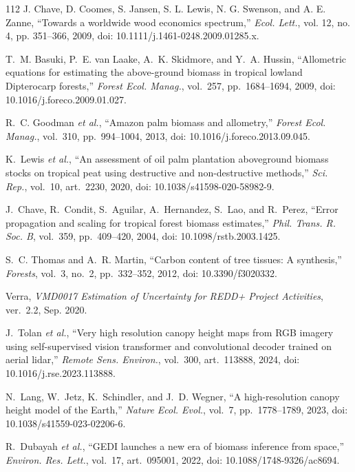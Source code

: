 \documentclass[conference,a4paper]{IEEEtran}
\begin{document}
\begin{thebibliography}{112}
J. Chave, D. Coomes, S. Jansen, S. L. Lewis, N. G. Swenson, and A. E. Zanne, ``Towards a worldwide wood economics spectrum,'' \textit{Ecol. Lett.}, vol. 12, no. 4, pp. 351--366, 2009, doi: 10.1111/j.1461-0248.2009.01285.x.

T.~M. Basuki, P.~E. van Laake, A.~K. Skidmore, and Y.~A. Hussin, ``Allometric equations for estimating the above-ground biomass in tropical lowland Dipterocarp forests,'' \textit{Forest Ecol. Manag.}, vol.~257, pp.~1684--1694, 2009, doi: 10.1016/j.foreco.2009.01.027.

R.~C. Goodman \textit{et al.}, ``Amazon palm biomass and allometry,'' \textit{Forest Ecol. Manag.}, vol.~310, pp.~994--1004, 2013, doi: 10.1016/j.foreco.2013.09.045.

K.~Lewis \textit{et al.}, ``An assessment of oil palm plantation aboveground biomass stocks on tropical peat using destructive and non-destructive methods,'' \textit{Sci. Rep.}, vol.~10, art.~2230, 2020, doi: 10.1038/s41598-020-58982-9.

J.~Chave, R.~Condit, S.~Aguilar, A.~Hernandez, S.~Lao, and R.~Perez, ``Error propagation and scaling for tropical forest biomass estimates,'' \textit{Phil. Trans. R. Soc. B}, vol.~359, pp.~409--420, 2004, doi: 10.1098/rstb.2003.1425.

S.~C. Thomas and A.~R. Martin, ``Carbon content of tree tissues: A synthesis,'' \textit{Forests}, vol.~3, no.~2, pp.~332--352, 2012, doi: 10.3390/f3020332.

Verra, \textit{VMD0017 Estimation of Uncertainty for REDD+ Project Activities}, ver.~2.2, Sep. 2020.

J.~Tolan \textit{et al.}, ``Very high resolution canopy height maps from RGB imagery using self-supervised vision transformer and convolutional decoder trained on aerial lidar,'' \textit{Remote Sens. Environ.}, vol.~300, art.~113888, 2024, doi: 10.1016/j.rse.2023.113888.

N.~Lang, W.~Jetz, K.~Schindler, and J.~D. Wegner, ``A high-resolution canopy height model of the Earth,'' \textit{Nature Ecol. Evol.}, vol.~7, pp.~1778--1789, 2023, doi: 10.1038/s41559-023-02206-6.

R.~Dubayah \textit{et al.}, ``GEDI launches a new era of biomass inference from space,'' \textit{Environ. Res. Lett.}, vol.~17, art.~095001, 2022, doi: 10.1088/1748-9326/ac8694.


\end{thebibliography}
\end{document}
